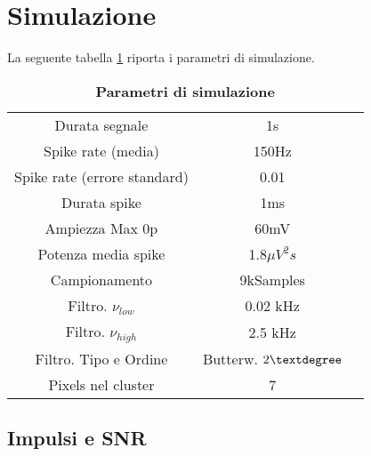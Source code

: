 \documentclass[9pt,twocolumn,twoside]{osajnl}
\begin{document}
\section{Simulazione}
\label{sec:examples}

La seguente tabella \ref{tab:param} riporta i parametri di simulazione.

\begin{table}[htbp]
\centering
\caption{\bf Parametri di simulazione}
\begin{tabular}{ccc}
\hline
Durata segnale                  & 1s                \\
Spike rate (media)              & 150Hz             \\
Spike rate (errore standard)    & 0.01              \\
Durata spike                    & 1ms               \\
Ampiezza Max 0p                 & 60mV              \\
Potenza media spike             & 1.8$\mu V^{2}s$   \\
Campionamento                   & 9kSamples         \\
Filtro. $\nu_{low}$             & 0.02 kHz          \\
Filtro. $\nu_{high}$            & 2.5 kHz           \\
Filtro. Tipo e Ordine           & Butterw. $2\textdegree$ \\
Pixels nel cluster              & 7                 \\
\hline
\end{tabular}
\label{tab:param}
\end{table}



\subsection{Impulsi e SNR}
\end{document}
